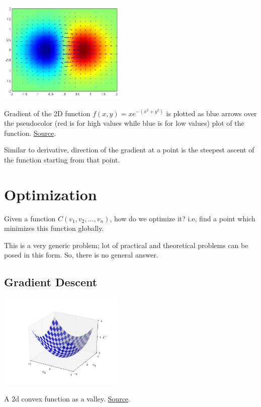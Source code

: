\documentclass[a4paper]{tufte-handout}
\begin{document}
\begin{marginfigure}
  \includegraphics[height=50mm]{gradient.png}
  \caption{Gradient of the 2D function \(f(x, y) = xe^{−(x^2 + y^2)}\) is
plotted as blue arrows over the pseudocolor (red is for high values
while blue is for low values) plot of the function.
\href{https://en.wikipedia.org/wiki/Gradient}{Source}.}
\end{marginfigure}


Similar to derivative, direction of the gradient at a point is the
steepest ascent of the function starting from that point.

\section{Optimization}\label{optimization}

Given a function \(C(v_1, v_2, \ldots, v_n)\), how do we optimize it?
i.e, find a point which minimizes this function globally.

This is a very generic problem; lot of practical and theoretical
problems can be posed in this form. So, there is no general answer.

\subsection{Gradient Descent}\label{gradient-descent}

\begin{marginfigure}
  \includegraphics[width=60mm]{valley.png}
  \caption{A 2d convex function as a valley. 
        \href{http://neuralnetworksanddeeplearning.com/chap1.html}{Source}.}
\end{marginfigure}
\end{document}
